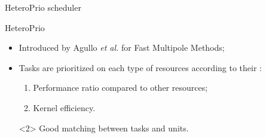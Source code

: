 \begin{frame}[t]{HeteroPrio scheduler}
  
  \vspace{-0.5cm}

  \begin{center}
  \end{center}

  \vspace{-0.5cm}

  \begin{block}{HeteroPrio}
    \begin{itemize}
    \item Introduced by Agullo \textit{et al.} for Fast Multipole Methods;
    \item Tasks are prioritized on each type of resources
      according to their :
      \begin{enumerate}
      \item Performance ratio compared to other resources;
      \item Kernel efficiency.
      \end{enumerate}
    \item[\dg{$\blacktriangle$}]<2> Good matching between tasks
      and units.
    \end{itemize}
  \end{block}
\end{frame}

